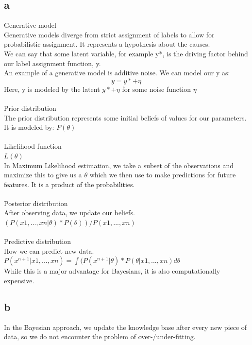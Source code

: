\documentclass[11pt,a4paper]{article}
\begin{document}
  \subsection*{a}
Generative model\\
Generative models diverge from strict assignment of labels to allow for probabilistic assignment.  It represents a hypothesis about the causes.\\
We can say that some latent variable, for example y*, is the driving factor behind our label assignment function, y.\\
An example of a generative model is additive noise.  We can model our y as:\\
\begin{equation*}
y = y* + \eta
\end{equation*}
Here, y is modeled by the latent $y* + \eta$ for some noise function $\eta$ \\\\
Prior distribution\\
The prior distribution represents some initial beliefs of values for our parameters.  It is modeled by: $P(\theta)$\\\\
Likelihood function\\
$L(\theta)$\\
In Maximum Likelihood estimation, we take a subset of the observations and maximize this to give us a $\theta$ which we then use to make predictions for future features.  It is a product of the probabilities.\\\\
Posterior distribution\\
After observing data, we update our beliefs.\\
$(P(x1, ..., xn | \theta) * P(\theta)) / P(x1, ..., xn)$\\\\
Predictive distribution\\
How we can predict new data.\\
$P(x^{n+1} | x1, ..., xn) = \int (P(x^{n+1} | \theta) * P(\theta | x1, ... , xn)d\theta$\\
While this is a major advantage for Bayesians, it is also computationally expensive.\\

  \subsection*{b}
In the Bayesian approach, we update the knowledge base after every new piece of data, so we do not encounter the problem of over-/under-fitting.
\end{document}
